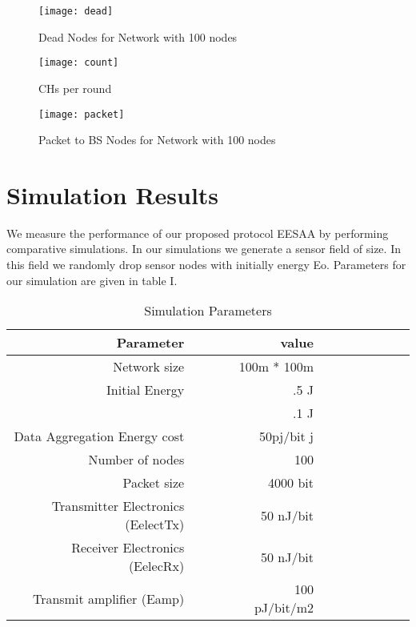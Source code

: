\documentclass[journal]{IEEEtran}
\begin{document}
 \begin{figure*}[t]
\centering
  \texttt{[image: dead]}
  \caption{Dead Nodes for  Network with 100 nodes}\label{abc}
\end{figure*}

\begin{figure*}[t]
\centering
  \texttt{[image: count]}
  \caption{CHs per round}\label{abc}
\end{figure*}

\begin{figure*}[t]
\centering
  \texttt{[image: packet]}
  \caption{Packet to BS Nodes for  Network with 100 nodes}\label{abc}
\end{figure*}

 \section{Simulation Results}
 We measure the performance of our proposed protocol EESAA by performing comparative simulations. In our simulations we generate a sensor field of  size. In this field we randomly drop  sensor nodes with initially energy Eo. Parameters for our simulation are given in table I.


\begin{table}[h]
  \centering
  \caption{Simulation Parameters}
    \begin{tabular}{rrrrrrrrrr|rr}
Parameter                                                           &       &       &       & value &  \\ \hline
Network size        &       &       &       &            100m * 100m      &  \\\hline
    Initial Energy        &       &       &       &                .5 J      &  \\\hline
          &       &       &       &                      .1 J      &  \\\hline
    Data Aggregation Energy cost      &       &       &       &                      50pj/bit j      &  \\\hline
    Number of nodes       &       &       &       &                     100      &  \\\hline
    Packet size        &       &       &       &             4000 bit       &  \\\hline
    Transmitter Electronics (EelectTx) &       &       &       & 50 nJ/bit      &  \\\hline
    Receiver Electronics (EelecRx)     &       &       &       & 50 nJ/bit &  \\\hline
    Transmit amplifier (Eamp)            &       &       &       & 100 pJ/bit/m2 &  \\\hline

\end{tabular}\end{table}
\end{document}
